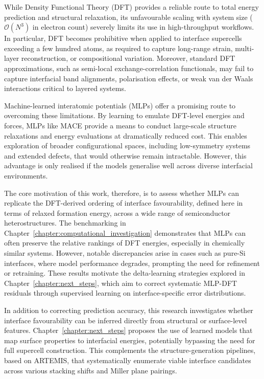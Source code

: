 While Density Functional Theory (DFT) provides a reliable route to total energy prediction and structural relaxation,
its unfavourable scaling with system size ($\mathcal{O}(N^3)$ in electron count) severely limits its use in
high-throughput workflows. In particular, DFT becomes prohibitive when applied to interface supercells exceeding a few
hundred atoms, as required to capture long-range strain, multi-layer reconstruction, or compositional variation.
Moreover, standard DFT approximations, such as semi-local exchange-correlation functionals, may fail to capture
interfacial band alignments, polarisation effects, or weak van der Waals interactions critical to layered systems.

Machine-learned interatomic potentials (MLPs) offer a promising route to overcoming these limitations. By learning to
emulate DFT-level energies and forces, MLPs like MACE provide a means to conduct large-scale structure relaxations and
energy evaluations at dramatically reduced cost. This enables exploration of broader configurational spaces, including
low-symmetry systems and extended defects, that would otherwise remain intractable. However, this advantage is only
realised if the models generalise well across diverse interfacial environments.

The core motivation of this work, therefore, is to assess whether MLPs can replicate the DFT-derived ordering of
interface favourability, defined here in terms of relaxed formation energy, across a wide range of semiconductor
heterostructures. The benchmarking in Chapter~\ref{chapter:computational_investigation} demonstrates that MLPs can
often preserve the relative rankings of DFT energies, especially in chemically similar systems. However, notable
discrepancies arise in cases such as pure-Si interfaces, where model performance degrades, prompting the need for
refinement or retraining. These results motivate the delta-learning strategies explored in
Chapter~\ref{chapter:next_steps}, which aim to correct systematic MLP-DFT residuals through supervised learning on
interface-specific error distributions.

In addition to correcting prediction accuracy, this research investigates whether interface favourability can be
inferred directly from structural or surface-level features. Chapter~\ref{chapter:next_steps} proposes the use of
learned models that map surface properties to interfacial energies, potentially bypassing the need for full supercell
construction. This complements the structure-generation pipelines, based on ARTEMIS, that systematically enumerate
viable interface candidates across various stacking shifts and Miller plane pairings.

